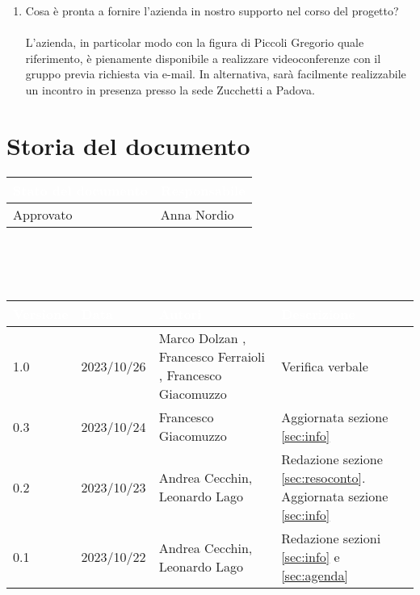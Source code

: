 \documentclass[12pt]{article}
\begin{document}
\begin{enumerate}
    \item Cosa è pronta a fornire l'azienda in nostro supporto nel corso del progetto?\\ \\
L'azienda, in particolar modo con la figura di Piccoli Gregorio quale riferimento, è pienamente disponibile a realizzare videoconferenze con il gruppo previa richiesta via e-mail. In alternativa, sarà facilmente realizzabile un incontro in presenza presso la sede Zucchetti a Padova.
    
\end{enumerate}

\section{Storia del documento} \label{sec:storia}
\begingroup
\setlength{\tabcolsep}{10pt}
\renewcommand{\arraystretch}{1.5}
\begin{tabularx}{\textwidth}{| X | X |}
    \hline
    \rowcolor{headerrow} \textbf{\textcolor{white}{Stato del documento}} & \textbf{\textcolor{white}{Responsabile}} \\
    \hline
    Approvato & Anna Nordio\\
    \hline   
\end{tabularx}
\\\\\\
\begin{tabularx}{\textwidth}{| l | l | X | X |}
    \hline
    \rowcolor{headerrow} \textbf{\textcolor{white}{Versione}} & \textbf{\textcolor{white}{Data}} & \textbf{\textcolor{white}{Autori}} & \textbf{\textcolor{white}{Descrizione}} \\
    \hline
    1.0 & 2023/10/26 & Marco Dolzan , Francesco Ferraioli , Francesco Giacomuzzo & Verifica verbale \\
    \hline
    0.3 & 2023/10/24 & Francesco Giacomuzzo & Aggiornata sezione \ref{sec:info}\\
    \hline
    0.2 & 2023/10/23 & Andrea Cecchin, Leonardo Lago & Redazione sezione \ref{sec:resoconto}. Aggiornata sezione \ref{sec:info}\\
    \hline
    0.1 & 2023/10/22 & Andrea Cecchin, Leonardo Lago  & Redazione sezioni \ref{sec:info} e \ref{sec:agenda}\\
    \hline
\end{tabularx}  
\endgroup
\end{document}
